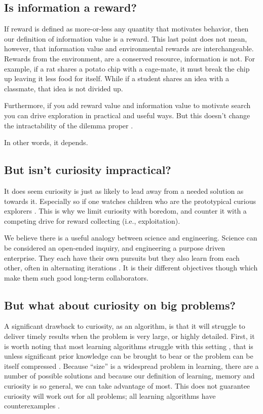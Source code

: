 \subsection*{Is information a reward?}
If reward is defined as more-or-less any quantity that motivates behavior, then our definition of information value is a reward. This last point does not mean, however, that information value and environmental rewards are interchangeable. Rewards from the environment, are a conserved resource, information is not. For example, if a rat shares a potato chip with a cage-mate, it must break the chip up leaving it less food for itself. While if a student shares an idea with a classmate, that idea is not divided up. 

Furthermore, if you add reward value and information value to motivate search you can drive exploration in practical and useful ways. But this doesn't change the intractability of the dilemma proper \citep{Thrun1992a,Dayan1996,Findling2018,Gershman2018b}. 

In other words, it depends. 


\subsection*{But isn't curiosity impractical?}
It does seem curiosity is just as likely to lead away from a needed solution as towards it. Especially so if one watches children who are the prototypical curious explorers \citep{Sumner2019,Kidd2015}. This is why we limit curiosity with boredom, and counter it with a competing drive for reward collecting (i.e., exploitation). 

We believe there is a useful analogy between science and engineering. Science can be considered an open-ended inquiry, and engineering a purpose driven enterprise. They each have their own pursuits but they also learn from each other, often in alternating iterations \citep{Gupta2006}. It is their different objectives though which make them such good long-term collaborators.


\subsection*{But what about curiosity on big problems?}
A significant drawback to curiosity, as an algorithm, is that it will struggle to deliver timely results when the problem is very large, or highly detailed. First, it is worth noting that most learning algorithms struggle with this setting \citep{MacKay2003,Sutton2018}, that is unless significant prior knowledge can be brought to bear \citep{Zhang2020,Sutton2018} or the problem can be itself compressed \citep{Ha2018a,Fister2019}. Because ``size'' is a widespread problem in learning, there are a number of possible solutions and because our definition of learning, memory and curiosity is so general, we can take advantage of most. This does not guarantee curiosity will work out for all problems; all learning algorithms have counterexamples \citep{Wolpert1997}. 


